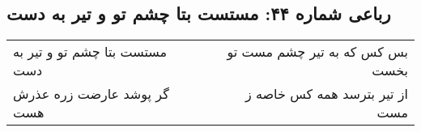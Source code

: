 \begin{center}
\section*{رباعی شماره ۴۴: مستست بتا چشم تو و تیر به دست}
\label{sec:sh044}
\begin{longtable}{l p{0.5cm} r}
مستست بتا چشم تو و تیر به دست
&&
بس کس که به تیر چشم مست تو بخست
\\
گر پوشد عارضت زره عذرش هست
&&
از تیر بترسد همه کس خاصه ز مست
\\
\end{longtable}
\end{center}
